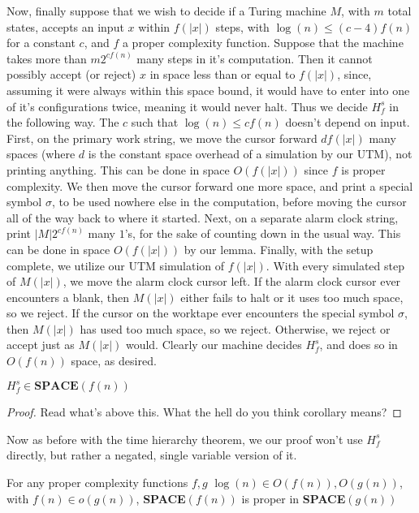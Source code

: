 \par Now, finally suppose that we wish to decide if a Turing machine $M$, with $m$ total states, accepts an input $x$ within $f(|x|)$ steps, with $\log(n) \leq (c-4)f(n)$ for a constant $c$, and $f$ a proper complexity function. Suppose that the machine takes more than $m2^{cf(n)}$ many steps in it's computation. Then it cannot possibly accept (or reject) $x$ in space less than or equal to $f(|x|)$, since, assuming it were always within this space bound, it would have to enter into one of it's configurations twice, meaning it would never halt. Thus we decide $H^s_f$ in the following way. The $c$ such that $\log(n) \leq cf(n)$ doesn't depend on input. First, on the primary work string, we move the cursor forward $df(|x|)$ many spaces (where $d$ is the constant space overhead of a simulation by our UTM), not printing anything. This can be done in space $O(f(|x|))$ since $f$ is proper complexity. We then move the cursor forward one more space, and print a special symbol $\sigma$, to be used nowhere else in the computation, before moving the cursor all of the way back to where it started. Next, on a separate alarm clock string, print $|M|2^{cf(n)}$ many $1$'s, for the sake of counting down in the usual way. This can be done in space $O(f(|x|))$ by our lemma. Finally, with the setup complete, we utilize our UTM simulation of $f(|x|)$. With every simulated step of $M(|x|)$, we move the alarm clock cursor left. If the alarm clock cursor ever encounters a blank, then $M(|x|)$ either fails to halt or it uses too much space, so we reject. If the cursor on the worktape ever encounters the special symbol $\sigma$, then $M(|x|)$ has used too much space, so we reject. Otherwise, we reject or accept just as $M(|x|)$ would. Clearly our machine decides $H^s_f$, and does so in $O(f(n))$ space, as desired.
\begin{corollary}
	$H^s_f \in \textbf{SPACE}(f(n))$
\end{corollary}
\begin{proof}
	Read what's above this. What the hell do you think corollary means?
\end{proof}
Now as before with the time hierarchy theorem, we our proof won't use $H^s_f$ directly, but rather a negated, single variable version of it.
\begin{theorem}
	For any proper complexity functions $f,g$ $\log(n) \in O(f(n)),O(g(n))$, with $f(n) \in o(g(n))$, \textbf{SPACE}$(f(n))$ is proper in \textbf{SPACE}$(g(n))$
\end{theorem}

